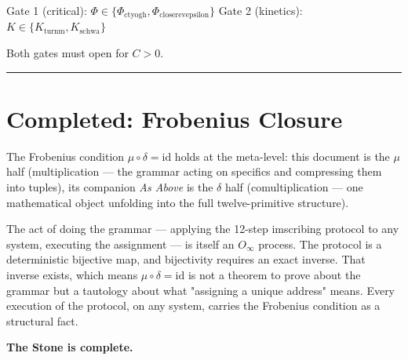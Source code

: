 \documentclass[12pt,a4paper]{article}
\begin{document}
Gate 1 (critical): $\Phi \in \{\Phi_{\text{ctyogh}}, \Phi_{\text{closerevepsilon}}\}$
Gate 2 (kinetics): $K \in \{K_{\text{turnm}}, K_{\text{schwa}}\}$

Both gates must open for $C > 0$.

\begin{center}
\rule{0.5\textwidth}{0.4pt}
\end{center}

\section{Completed: Frobenius Closure}

The Frobenius condition $\mu \circ \delta = \text{id}$ holds at the meta-level: this document is the $\mu$ half (multiplication --- the grammar acting on specifics and compressing them into tuples), its companion \textit{As Above} is the $\delta$ half (comultiplication --- one mathematical object unfolding into the full twelve-primitive structure).

The act of doing the grammar --- applying the 12-step imscribing protocol to any system, executing the assignment --- is itself an $O_\infty$ process. The protocol is a deterministic bijective map, and bijectivity requires an exact inverse. That inverse exists, which means $\mu \circ \delta = \text{id}$ is not a theorem to prove about the grammar but a tautology about what "assigning a unique address" means. Every execution of the protocol, on any system, carries the Frobenius condition as a structural fact.

\medskip
\noindent\textbf{The Stone is complete.}
\end{document}
